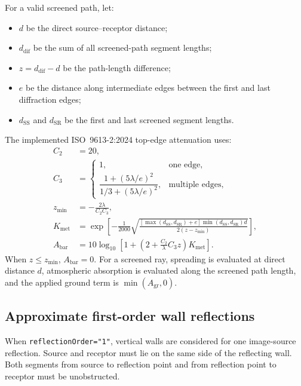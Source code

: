 \documentclass[11pt,a4paper]{article}
\newcommand{\code}[1]{\texttt{#1}}
\begin{document}
For a valid screened path, let:
\begin{itemize}
  \item $d$ be the direct source--receptor distance;
  \item $d_{\mathrm{dif}}$ be the sum of all screened-path segment lengths;
  \item $z=d_{\mathrm{dif}}-d$ be the path-length difference;
  \item $e$ be the distance along intermediate edges between the first and last
        diffraction edges;
  \item $d_{\mathrm{SS}}$ and $d_{\mathrm{SR}}$ be the first and last screened
        segment lengths.
\end{itemize}
The implemented ISO~9613-2:2024 top-edge attenuation uses:
\begin{align}
  C_2 &= 20, \\
  C_3 &=
  \begin{cases}
    1, & \text{one edge}, \\
    \dfrac{1+(5\lambda/e)^2}{1/3+(5\lambda/e)^2}, & \text{multiple edges},
  \end{cases} \\
  z_{\min} &= -\frac{2\lambda}{C_2C_3}, \\
  K_{\mathrm{met}} &=
  \exp\left[
    -\frac{1}{2000}
    \sqrt{
      \frac{
        [\max(d_{\mathrm{SS}},d_{\mathrm{SR}})+e]
        \min(d_{\mathrm{SS}},d_{\mathrm{SR}})d
      }{
        2(z-z_{\min})
      }
    }
  \right], \\
  A_{\mathrm{bar}} &=
  10\log_{10}\left[
    1+
    \left(2+\frac{C_2}{\lambda}C_3z\right)K_{\mathrm{met}}
  \right].
  \label{eq:noise-barrier}
\end{align}
When $z\leq z_{\min}$, $A_{\mathrm{bar}}=0$. For a screened ray, spreading is
evaluated at direct distance $d$, atmospheric absorption is evaluated along the
screened path length, and the applied ground term is
$\min(A_{\mathrm{gr}},0)$.

\subsection{Approximate first-order wall reflections}

When \code{reflectionOrder="1"}, vertical walls are considered for one
image-source reflection. Source and receptor must lie on the same side of the
reflecting wall. Both segments from source to reflection point and from
reflection point to receptor must be unobstructed.
\end{document}
